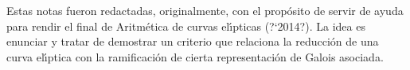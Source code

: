 Estas notas fueron redactadas, originalmente, con el prop\'{o}sito de servir de
ayuda para rendir el final de Aritm\'{e}tica de curvas el\'{\i}pticas
(?`2014?). La idea es enunciar y tratar de demostrar un criterio que relaciona
la reducci\'{o}n de una curva el\'{\i}ptica con la ramificaci\'{o}n de cierta
representaci\'{o}n de Galois asociada.

